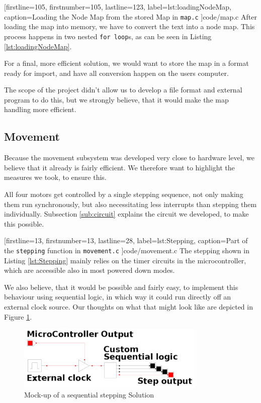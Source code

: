 
[firstline=105,				%
firstnumber=105,
lastline=123,
label=lst:loadingNodeMap,	%
caption={Loading the Node Map from the stored Map in {\tt map.c}}
]{code/map.c}
%
After loading the map into memory,
we have to convert the text into a node map.
This process happens in two nested {\tt for loop}s, as can be seen in Listing \ref{lst:loadingNodeMap}.

For a final, more efficient solution,
we would want to store the map in a format ready for import,
and have all conversion happen on the users computer.

The scope of the project didn't allow us to develop a file format and external program to do this,
but we strongly believe,
that it would make the map handling more efficient.

\subsection{Movement}
Because the movement subsystem was developed very close to hardware level,
we believe that it already is fairly efficient.
We therefore want to highlight the measures we took,
to ensure this.

All four motors get controlled by a single stepping sequence,
not only making them run synchronously,
but also necessitating less interrupts than stepping them individually.
Subsection \ref{sub:circuit} explains the circuit we developed,
to make this possible.


[firstline=13,				%
firstnumber=13,
lastline=28,
label=lst:Stepping,	%
caption={Part of the {\tt stepping} function in {\tt movement.c}}
]{code/movement.c}
%
The stepping shown in Listing \ref{lst:Stepping} mainly relies on the timer circuits in the microcontroller,
which are accessible also in most powered down modes.

We also believe, that it would be possible and fairly easy,
to implement this behaviour using sequential logic,
in which way it could run directly off an external clock source.
Our thoughts on what that might look like are depicted in Figure \ref{fig:sequential}.

\begin{figure}[hp]
	\centering
	\includegraphics[width=0.8\textwidth]{figures/move/sequential_logic}
	\caption{Mock-up of a sequential stepping Solution}
	\label{fig:sequential}
\end{figure}
%